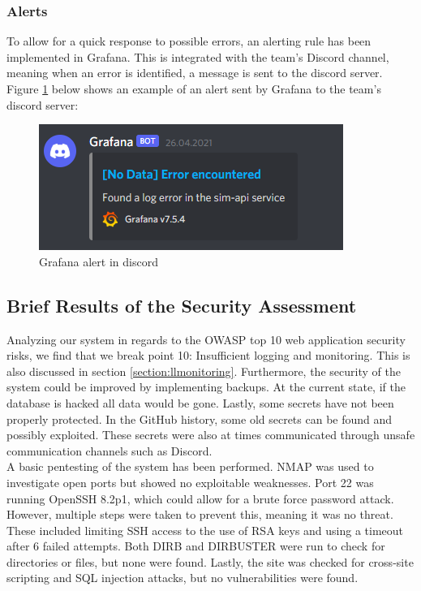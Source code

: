 \subsubsection{Alerts}\label{section:alerts}
To allow for a quick response to possible errors, an alerting rule has been implemented in Grafana. This is integrated with the team's Discord channel, meaning when an error is identified, a message is sent to the discord server. Figure \ref{fig:grafana-alert} below shows an example of an alert sent by Grafana to the team's discord server:

\begin{figure}[H]
    \centering
    \includegraphics[width=0.6\linewidth]{report/images/grafana-alert.png}
    \caption{Grafana alert in discord}
    \label{fig:grafana-alert}
\end{figure}

\subsection{Brief Results of the Security Assessment}
Analyzing our system in regards to the OWASP top 10 web application security risks, we find that we break point 10: Insufficient logging and monitoring. This is also discussed in section \ref{section:llmonitoring}. Furthermore, the security of the system could be improved by implementing backups. At the current state, if the database is hacked all data would be gone. Lastly, some secrets have not been properly protected. In the GitHub history, some old secrets can be found and possibly exploited. These secrets were also at times communicated through unsafe communication channels such as Discord.\\   

A basic pentesting of the system has been performed. NMAP was used to investigate open ports but showed no exploitable weaknesses. Port 22 was running OpenSSH 8.2p1, which could allow for a brute force password attack. However, multiple steps were taken to prevent this, meaning it was no threat. These included limiting SSH access to the use of RSA keys and using a timeout after 6 failed attempts. Both DIRB and DIRBUSTER were run to check for directories or files, but none were found. Lastly, the site was checked for cross-site scripting and SQL injection attacks, but no vulnerabilities were found.


